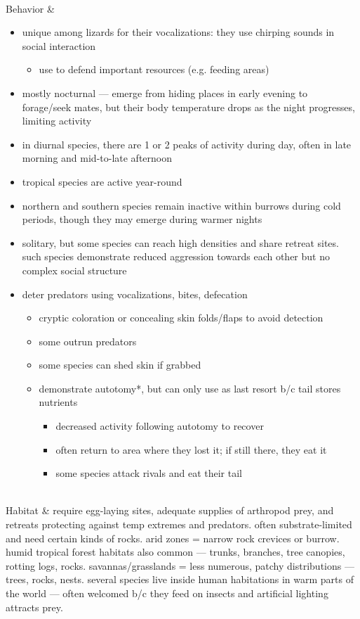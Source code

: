 \begin{center}
\begin{longtabu}
	\\
	\hline
	Behavior & 
	\begin{itemize}[noitemsep]
		\item unique among lizards for their vocalizations: they use chirping sounds in social interaction
			\begin{itemize}[noitemsep]
				\item use to defend important resources (e.g. feeding areas)
			\end{itemize}
		\item mostly nocturnal --- emerge from hiding places in early evening to forage/seek mates, but their body temperature drops as the night progresses, limiting activity
		\item in diurnal species, there are 1 or 2 peaks of activity during day, often in late morning and mid-to-late afternoon
		\item tropical species are active year-round
		\item northern and southern species remain inactive within burrows during cold periods, though they may emerge during warmer nights
		\item solitary, but some species can reach high densities and share retreat sites. such species demonstrate reduced aggression towards each other but no complex social structure
		\item deter predators using vocalizations, bites, defecation
			\begin{itemize}[noitemsep]
				\item cryptic coloration or concealing skin folds/flaps to avoid detection
				\item some outrun predators
				\item some species can shed skin if grabbed
				\item demonstrate autotomy*, but can only use as last resort b/c tail stores nutrients
					\begin{itemize}[noitemsep]
						\item decreased activity following autotomy to recover
						\item often return to area where they lost it; if still there, they eat it
						\item some species attack rivals and eat their tail
					\end{itemize}
			\end{itemize}
	\end{itemize}
	\\
	\hline
	Habitat & 
	require egg-laying sites, adequate supplies of arthropod prey, and retreats protecting against temp extremes and predators. often substrate-limited and need certain kinds of rocks. arid zones = narrow rock crevices or burrow. humid tropical forest habitats also common --- trunks, branches, tree canopies, rotting logs, rocks. savannas/grasslands = less numerous, patchy distributions --- trees, rocks, nests. several species live inside human habitations in warm parts of the world --- often welcomed b/c they feed on insects and artificial lighting attracts prey.

\end{longtabu}
\end{center}
